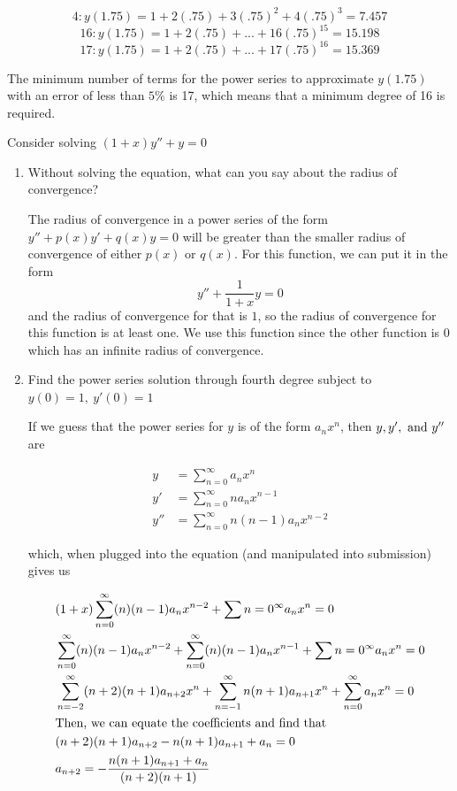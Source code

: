 \documentclass[11pt,answers]{exam}
\begin{document}
\begin{questions}
\begin{solution}
\begin{parts}
\[
4: y(1.75) = 1 + 2(.75) + 3(.75)^2 + 4(.75)^3 = 7.457
\]
\[
16: y(1.75) = 1 + 2(.75) + ... + 16(.75)^{15}  = 15.198
\]
\[
17: y(1.75) = 1 + 2(.75) + ... + 17(.75)^{16}  = 15.369
\]

The minimum number of terms for the power series to approximate $y(1.75)$ with an error of less than $5\%$ is 17, which means that a minimum degree of 16 is required. 
\end{parts}
\end{solution}

\item Consider solving $(1 + x)y'' + y = 0$

\begin{solution}
\begin{enumerate}
\item Without solving the equation, what can you say about the radius of convergence?

The radius of convergence in a power series of the form $y'' + p(x)y' + q(x)y = 0$ will be greater than the smaller radius of convergence of either $p(x)$ or $q(x)$.  For this function, we can put it in the form
\[
y'' + \frac{1}{1+x}y = 0
\]
and the radius of convergence for that is $1$, so the radius of convergence for this function is at least one.  We use this function since the other function is $0$ which has an infinite radius of convergence.

\item Find the power series solution through fourth degree subject to $y(0) = 1, ~ y'(0) = 1$

If we guess that the power series for $y$ is of the form $a_nx^n$, then $y, y', \hbox{ and } y''$ are

\begin{align*}
y &= \sum_{n = 0}^\infty a_nx^n \\
y' &= \sum_{n=0}^\infty na_n x^{n-1} \\
y'' &= \sum_{n=0}^\infty n(n-1)a_n x^{n-2}
\end{align*}

which, when plugged into the equation (and manipulated into submission) gives us

\begin{align*}
&(1 + x)\sum_{n=0}^\infty (n)(n-1)a_nx^{n-2} + \sum{n=0}^\infty a_nx^n = 0 \\
&\sum_{n=0}^\infty (n)(n-1)a_nx^{n-2} + \sum_{n=0}^\infty (n)(n-1)a_nx^{n-1} + \sum{n=0}^\infty a_nx^n = 0 \\
&\sum_{n=-2}^\infty (n+2)(n+1)a_{n+2}x^n + \sum_{n=-1}^\infty n(n+1)a_{n+1}x^n + \sum_{n=0}^\infty a_nx^n = 0 \\
&\hbox{Then, we can equate the coefficients and find that} \\
&(n+2)(n+1)a_{n+2} - n(n+1)a_{n+1} + a_n = 0 \\
&a_{n+2} = -\frac{n(n+1)a_{n+1} + a_n}{(n+2)(n+1)} \\
\end{align*}


\end{enumerate}
\end{solution}
\end{questions}
\end{document}
